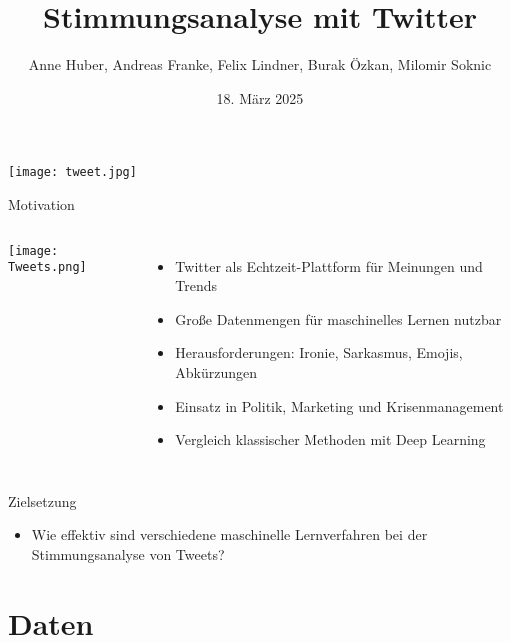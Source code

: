 \documentclass[aspectratio=169]{beamer} %
\title{Stimmungsanalyse mit Twitter}
\author[Team Twitter Sentiment]{Anne Huber, Andreas Franke, Felix Lindner, Burak Özkan, Milomir Soknic}
\institute{Projektpraktikum Web Science,\\Artificial Intelligence Group,\\Universität Hagen, Deutschland}
\date{18. März 2025}
\begin{document}
\begin{frame}
  \titlepage
\end{frame}

\begin{frame}
  \centering
  \texttt{[image: tweet.jpg]}
\end{frame}

\begin{frame}{Motivation}
  \begin{columns}
    \centering
    \texttt{[image: Tweets.png]}

    \begin{itemize}
        \item Twitter als Echtzeit-Plattform für Meinungen und Trends
        \item Große Datenmengen für maschinelles Lernen nutzbar
        \item Herausforderungen: Ironie, Sarkasmus, Emojis, Abkürzungen
        \item Einsatz in Politik, Marketing und Krisenmanagement
        \item Vergleich klassischer Methoden mit Deep Learning
    \end{itemize}
  \end{columns}
\end{frame}

\begin{frame}{Zielsetzung}
  \Large
  \begin{itemize}
      \item Wie effektiv sind verschiedene maschinelle Lernverfahren bei der Stimmungsanalyse von Tweets?
  \end{itemize}
\end{frame}

\section{Daten}
\end{document}
